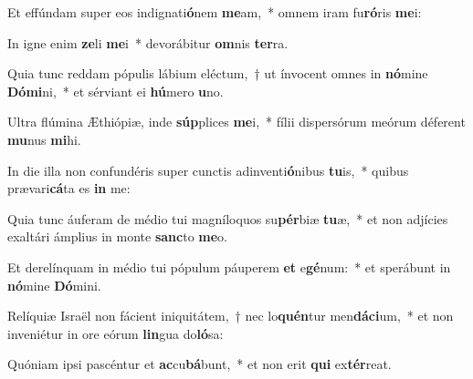 \item Et effúndam super eos indignati\textbf{ó}nem \textbf{me}am,~* omnem iram fu\textbf{ró}ris \textbf{me}i:
\item In igne enim \textbf{ze}li \textbf{me}i~* devorábitur \textbf{om}nis \textbf{ter}ra.
\item Quia tunc reddam pópulis lábium eléctum,~† ut ínvocent omnes in \textbf{nó}mine \textbf{Dó}\textbf{mi}ni,~* et sérviant ei \textbf{hú}mero \textbf{u}no.
\item Ultra flúmina Æthiópiæ, inde \textbf{súp}plices \textbf{me}i,~* fílii dispersórum meórum déferent \textbf{mu}nus \textbf{mi}hi.
\item In die illa non confundéris super cunctis adinventi\textbf{ó}nibus \textbf{tu}is,~* quibus prævari\textbf{cá}ta es \textbf{in} me:
\item Quia tunc áuferam de médio tui magníloquos su\textbf{pér}biæ \textbf{tu}æ,~* et non adjícies exaltári ámplius in monte \textbf{sanc}to \textbf{me}o.
\item Et derelínquam in médio tui pópulum páuperem \textbf{et} e\textbf{gé}num:~* et sperábunt in \textbf{nó}mine \textbf{Dó}mini.
\item Relíquiæ Israël non fácient iniquitátem,~† nec lo\textbf{quén}tur men\textbf{dá}\textbf{ci}um,~* et non inveniétur in ore eórum \textbf{lin}gua do\textbf{ló}sa:
\item Quóniam ipsi pascéntur et \textbf{ac}cu\textbf{bá}bunt,~* et non erit \textbf{qui} ex\textbf{tér}reat.
